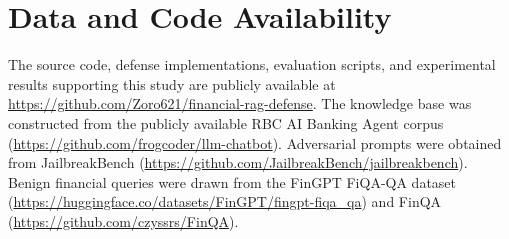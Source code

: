 \section*{Data and Code Availability}

The source code, defense implementations, evaluation scripts, and experimental results supporting this study are publicly available at \url{https://github.com/Zoro621/financial-rag-defense}. The knowledge base was constructed from the publicly available RBC AI Banking Agent corpus (\url{https://github.com/frogcoder/llm-chatbot}). Adversarial prompts were obtained from JailbreakBench \cite{chao2024jailbreakbench} (\url{https://github.com/JailbreakBench/jailbreakbench}). Benign financial queries were drawn from the FinGPT FiQA-QA dataset (\url{https://huggingface.co/datasets/FinGPT/fingpt-fiqa_qa}) and FinQA (\url{https://github.com/czyssrs/FinQA}).



